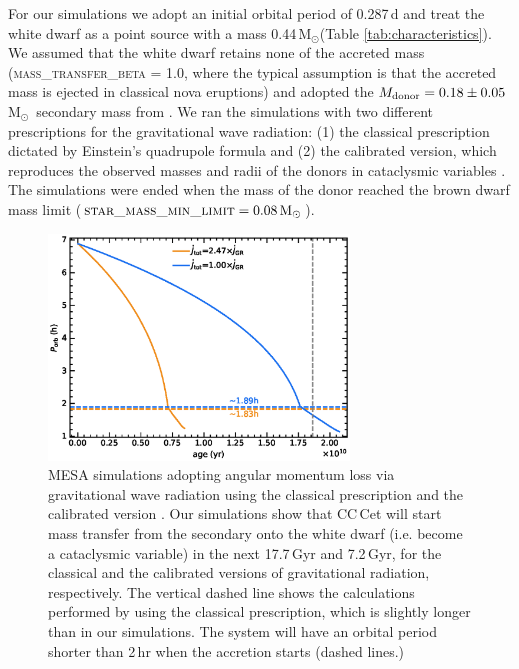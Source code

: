 \documentclass[fleqn,usenatbib]{mnras}
\newcommand{\Msun}{\mbox{$\mathrm{M}_{\odot}$}}
\newcommand{\bgc}[1]{\textcolor{orange}{[#1]}}
\begin{document}

For our simulations we adopt an initial orbital period of 0.287\,d and treat the white dwarf as a point source with a mass 0.44\,\Msun (Table \ref{tab:characteristics}). We assumed that the white dwarf retains none of the accreted mass (\textsc{mass\_transfer\_beta} = 1.0, where the typical assumption is that the accreted mass is ejected in classical nova eruptions) and adopted the $M_{\rm donor}=0.18\pm0.05$\,\Msun\ secondary mass from \citet{safferetal93-1}. We ran the simulations with two different prescriptions for the gravitational wave radiation: (1) the classical prescription dictated by Einstein's quadrupole formula \citep{paczynski67-1} and (2) the calibrated version, which reproduces the observed masses and radii of the donors in cataclysmic variables \citep{kniggeetal11-1}. The simulations were ended when the mass of the donor reached the brown dwarf mass limit ($\mbox{\textsc{star\_mass\_min\_limit}}=0.08\,\Msun$).

\begin{figure}
    \centering
    \includegraphics[width=8cm]{Porb_age_v2.eps}
    \caption{MESA simulations adopting angular momentum loss via gravitational wave radiation using the classical prescription \citep[][blue]{paczynski67-1} and the calibrated version \citep[][ orange]{kniggeetal11-1}. Our simulations show that CC\,Cet will start mass transfer from the secondary onto the white dwarf (i.e. become a cataclysmic variable) in the next 17.7\,Gyr and 7.2\,Gyr, for the classical and the calibrated versions of gravitational radiation, respectively. The vertical dashed line shows the calculations performed by \citet{schreiber+gaensicke03-1} using the classical prescription, which is slightly longer than in our simulations. The system will have an orbital period shorter than 2\,hr when the accretion starts (dashed lines.) }
    \label{fig:MESA}
\end{figure}
\end{document}
